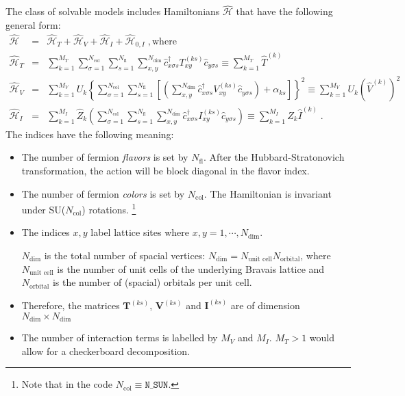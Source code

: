 The class of solvable models includes  Hamiltonians $\hat{\mathcal{H}}$ that have the following general form:
\begin{eqnarray}
\hat{\mathcal{H}}&=&\hat{\mathcal{H}}_{T}+\hat{\mathcal{H}}_{V} +  \hat{\mathcal{H}}_{I} +   \hat{\mathcal{H}}_{0,I}\;,\mathrm{where}
\label{eqn:general_ham}\\
\hat{\mathcal{H}}_{T}
&=&
\sum\limits_{k=1}^{M_T}
\sum\limits_{\sigma=1}^{N_{\mathrm{col}}}
\sum\limits_{s=1}^{N_{\mathrm{fl}}}
\sum\limits_{x,y}^{N_{\mathrm{dim}}}
\hat{c}^{\dagger}_{x \sigma   s}T_{xy}^{(k s)} \hat{c}^{\phantom\dagger}_{y \sigma s}  \equiv  \sum\limits_{k=1}^{M_T} \hat{T}^{(k)}
\label{eqn:general_ham_t}\\
\hat{\mathcal{H}}_{V}
&=&
\sum\limits_{k=1}^{M_V}U_{k}
\left\{
\sum\limits_{\sigma=1}^{N_{\mathrm{col}}}
\sum\limits_{s=1}^{N_{\mathrm{fl}}}
\left[
\left(
\sum\limits_{x,y}^{N_{\mathrm{dim}}}
\hat{c}^{\dagger}_{x \sigma s}V_{xy}^{(k s)}\hat{c}^{\phantom\dagger}_{y \sigma s}
\right)
+\alpha_{k s} 
\right]
\right\}^{2}  \equiv   
\sum\limits_{k=1}^{M_V}U_{k}   \left(\hat{V}^{(k)} \right)^2
\label{eqn:general_ham_v}\\
\hat{\mathcal{H}}_{I}  & = &
\sum\limits_{k=1}^{M_I} \hat{Z}_{k} 
\left(
\sum\limits_{\sigma=1}^{N_{\mathrm{col}}}
\sum\limits_{s=1}^{N_{\mathrm{fl}}}
\sum\limits_{x,y}^{N_{\mathrm{dim}}}
\hat{c}^{\dagger}_{x \sigma s} I_{xy}^{(k s)}\hat{c}^{\phantom\dagger}_{y \sigma s}
\right) \equiv \sum\limits_{k=1}^{M_I} \hat{Z}_{k}    \hat{I}^{(k)} 
\;.\label{eqn:general_ham_i}
\end{eqnarray}
The indices have the following meaning:
\begin{itemize}
\item The number of fermion \textit{flavors} is set by $N_{\mathrm{fl}}$.  After the Hubbard-Stratonovich transformation, the action will be block diagonal in the flavor index. 
\item The number of fermion \textit{colors} is set by $N_{\mathrm{col}}$.    The Hamiltonian is invariant under  SU($N_{\mathrm{col}}$)  rotations. \footnote{Note that  in the code $ N_{\mathrm{col}} \equiv \texttt{N\_{SUN}} $.} 
\item The indices $x,y$ label lattice sites where $x,y=1,\cdots, N_{\mathrm{dim}}$. 

$N_{\mathrm{dim}}$ is the total number of spacial vertices: $N_{\mathrm{dim}}=N_{\text{unit cell}} N_{\mathrm{orbital}}$, 
where $N_{\text{unit cell}}$ is the number of unit cells of the underlying Bravais lattice and $N_{\mathrm{orbital}}$ is the number of (spacial) orbitals per unit cell.
\item Therefore, the  matrices $\bm{T}^{(k s)}$, $\bm{V}^{(ks)}$  and $\bm{I}^{(ks)}$ are  of dimension $N_{\mathrm{dim}}\times N_{\mathrm{dim}}$
\item The number of interaction terms  is labelled by $M_V$   and $M_I$.   $M_T> 1 $ would allow for a checkerboard decomposition.
\end{itemize}
